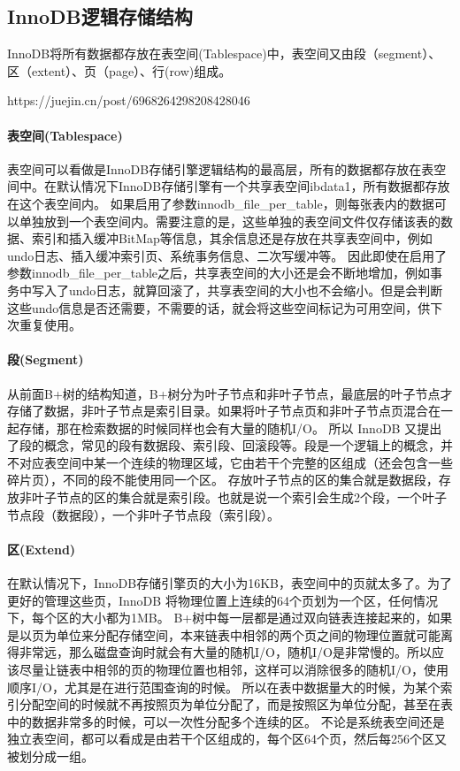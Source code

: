 \documentclass[../../../interview-questions.tex]{subfiles}
\begin{document}
\subsection{InnoDB逻辑存储结构}

InnoDB将所有数据都存放在表空间(Tablespace)中，表空间又由段（segment）、区（extent）、页（page）、行(row)组成。

https://juejin.cn/post/6968264298208428046

\paragraph{表空间(Tablespace)}

表空间可以看做是InnoDB存储引擎逻辑结构的最高层，所有的数据都存放在表空间中。在默认情况下InnoDB存储引擎有一个共享表空间ibdata1，所有数据都存放在这个表空间内。
如果启用了参数innodb\_file\_per\_table，则每张表内的数据可以单独放到一个表空间内。需要注意的是，这些单独的表空间文件仅存储该表的数据、索引和插入缓冲BitMap等信息，其余信息还是存放在共享表空间中，例如 undo日志、插入缓冲索引页、系统事务信息、二次写缓冲等。
因此即使在启用了参数innodb\_file\_per\_table之后，共享表空间的大小还是会不断地增加，例如事务中写入了undo日志，就算回滚了，共享表空间的大小也不会缩小。但是会判断这些undo信息是否还需要，不需要的话，就会将这些空间标记为可用空间，供下次重复使用。

\paragraph{段(Segment)}

从前面B+树的结构知道，B+树分为叶子节点和非叶子节点，最底层的叶子节点才存储了数据，非叶子节点是索引目录。如果将叶子节点页和非叶子节点页混合在一起存储，那在检索数据的时候同样也会有大量的随机I/O。
所以 InnoDB 又提出了段的概念，常见的段有数据段、索引段、回滚段等。段是一个逻辑上的概念，并不对应表空间中某一个连续的物理区域，它由若干个完整的区组成（还会包含一些碎片页），不同的段不能使用同一个区。
存放叶子节点的区的集合就是数据段，存放非叶子节点的区的集合就是索引段。也就是说一个索引会生成2个段，一个叶子节点段（数据段），一个非叶子节点段（索引段）。

\paragraph{区(Extend)}

在默认情况下，InnoDB存储引擎页的大小为16KB，表空间中的页就太多了。为了更好的管理这些页，InnoDB 将物理位置上连续的64个页划为一个区，任何情况下，每个区的大小都为1MB。
B+树中每一层都是通过双向链表连接起来的，如果是以页为单位来分配存储空间，本来链表中相邻的两个页之间的物理位置就可能离得非常远，那么磁盘查询时就会有大量的随机I/O，随机I/O是非常慢的。所以应该尽量让链表中相邻的页的物理位置也相邻，这样可以消除很多的随机I/O，使用顺序I/O，尤其是在进行范围查询的时候。
所以在表中数据量大的时候，为某个索引分配空间的时候就不再按照页为单位分配了，而是按照区为单位分配，甚至在表中的数据非常多的时候，可以一次性分配多个连续的区。
不论是系统表空间还是独立表空间，都可以看成是由若干个区组成的，每个区64个页，然后每256个区又被划分成一组。
\end{document}
